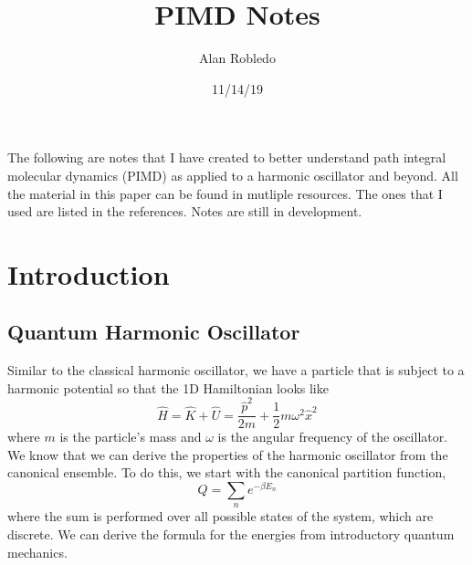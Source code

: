\documentclass{article}
\title{PIMD Notes}
\date{11/14/19}
\author{Alan Robledo}
\newcommand{\be}{\begin{equation}}
\newcommand{\ee}{\end{equation}}
\begin{document}
\maketitle

The following are notes that I have created to better understand path integral molecular dynamics (PIMD) as applied to a harmonic oscillator and beyond. All the material in this paper can be found in mutliple resources. The ones that I used are listed in the references. Notes are still in development.

\section{Introduction}
\subsection{Quantum Harmonic Oscillator}
Similar to the classical harmonic oscillator, we have a particle that is subject to a harmonic potential so that the 1D Hamiltonian looks like
\be \label{eq:harm_osc}
  \hat{H} = \hat{K} + \hat{U} = \frac{\hat{p}^2}{2m} + \frac{1}{2}m \omega^2\hat{x}^2
\ee
where $m$ is the particle's mass and $\omega$ is the angular frequency of the oscillator.
We know that we can derive the properties of the harmonic oscillator from the canonical ensemble. To do this, we start with the canonical partition function,
\be \label{eq:harm_part_func}
  Q = \sum_n e^{-\beta E_n}
\ee
where the sum is performed over all possible states of the system, which are discrete.\cite{tuckerman}
We can derive the formula for the energies from introductory quantum mechanics.
\end{document}
